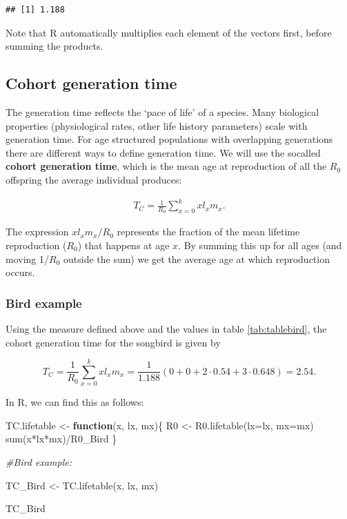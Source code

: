 \documentclass[
]{book}
\newenvironment{Shaded}{\begin{snugshade}}{\end{snugshade}}
\newcommand{\AttributeTok}[1]{\textcolor[rgb]{0.77,0.63,0.00}{#1}}
\newcommand{\CommentTok}[1]{\textcolor[rgb]{0.56,0.35,0.01}{\textit{#1}}}
\newcommand{\ControlFlowTok}[1]{\textcolor[rgb]{0.13,0.29,0.53}{\textbf{#1}}}
\newcommand{\FunctionTok}[1]{\textcolor[rgb]{0.00,0.00,0.00}{#1}}
\newcommand{\NormalTok}[1]{#1}
\newcommand{\OtherTok}[1]{\textcolor[rgb]{0.56,0.35,0.01}{#1}}
\newcommand{\SpecialCharTok}[1]{\textcolor[rgb]{0.00,0.00,0.00}{#1}}
\begin{document}
\begin{verbatim}
## [1] 1.188
\end{verbatim}

Note that R automatically multiplies each element of the vectors first, before summing the products.

\hypertarget{cohort-generation-time}{%
\subsection{Cohort generation time}\label{cohort-generation-time}}

The generation time reflects the `pace of life' of a species. Many biological properties (physiological rates, other life history parameters) scale with generation time. For age structured populations with overlapping generations there are different ways to define generation time. We will use the socalled \textbf{cohort generation time}, which is the mean age at reproduction of all the \(R_0\) offspring the average individual produces:

\begin{align}
T_C=\frac{1}{R_0}\sum_{x=0}^{k} xl_xm_x.
\label{eq:Generation}
\end{align}

The expression \(xl_xm_x/R_0\) represents the fraction of the mean lifetime reproduction (\(R_0\)) that happens at age \(x\). By summing this up for all ages (and moving 1/\(R_0\) outside the sum) we get the average age at which reproduction occurs.

\hypertarget{bird-example-1}{%
\subsubsection*{Bird example}\label{bird-example-1}}

Using the measure defined above and the values in table \ref{tab:tablebird}, the cohort generation time for the songbird is given by

\[
T_C=\frac{1}{R_0}\sum_{x=0}^k xl_xm_x=\frac{1}{1.188} (0+0+2\cdot0.54+3\cdot0.648)=2.54.
\]

In R, we can find this as follows:

\begin{Shaded}
\begin{Highlighting}[]
\NormalTok{TC.lifetable }\OtherTok{\textless{}{-}} \ControlFlowTok{function}\NormalTok{(x, lx, mx)\{}
\NormalTok{  R0 }\OtherTok{\textless{}{-}} \FunctionTok{R0.lifetable}\NormalTok{(}\AttributeTok{lx=}\NormalTok{lx, }\AttributeTok{mx=}\NormalTok{mx)}
  \FunctionTok{sum}\NormalTok{(x}\SpecialCharTok{*}\NormalTok{lx}\SpecialCharTok{*}\NormalTok{mx)}\SpecialCharTok{/}\NormalTok{R0\_Bird}
\NormalTok{\}}

\CommentTok{\#Bird example:}

\NormalTok{TC\_Bird }\OtherTok{\textless{}{-}} \FunctionTok{TC.lifetable}\NormalTok{(x,  lx, mx)}

\NormalTok{TC\_Bird}
\end{Highlighting}
\end{Shaded}
\end{document}
